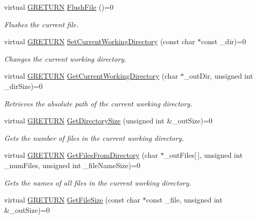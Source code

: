 \begin{DoxyCompactItemize}
virtual \hyperlink{namespace_g_w_a69b1aaebac1cac8049825f035884c95b}{G\+R\+E\+T\+U\+RN} \hyperlink{class_g_w_1_1_c_o_r_e_1_1_g_file_a185d248041bf79161654a00ddb38c314}{Flush\+File} ()=0
\begin{DoxyCompactList}\small\item\em Flushes the current file. \end{DoxyCompactList}\item 
virtual \hyperlink{namespace_g_w_a69b1aaebac1cac8049825f035884c95b}{G\+R\+E\+T\+U\+RN} \hyperlink{class_g_w_1_1_c_o_r_e_1_1_g_file_a53c4aba44ab5069f952f46ac8caee827}{Set\+Current\+Working\+Directory} (const char $\ast$const \+\_\+dir)=0
\begin{DoxyCompactList}\small\item\em Changes the current working directory. \end{DoxyCompactList}\item 
virtual \hyperlink{namespace_g_w_a69b1aaebac1cac8049825f035884c95b}{G\+R\+E\+T\+U\+RN} \hyperlink{class_g_w_1_1_c_o_r_e_1_1_g_file_a01e2d9e0f2266c694f68f527f1df330c}{Get\+Current\+Working\+Directory} (char $\ast$\+\_\+out\+Dir, unsigned int \+\_\+dir\+Size)=0
\begin{DoxyCompactList}\small\item\em Retrieves the absolute path of the current working directory. \end{DoxyCompactList}\item 
virtual \hyperlink{namespace_g_w_a69b1aaebac1cac8049825f035884c95b}{G\+R\+E\+T\+U\+RN} \hyperlink{class_g_w_1_1_c_o_r_e_1_1_g_file_a8210211fe369049a0a67f0329347fbfa}{Get\+Directory\+Size} (unsigned int \&\+\_\+out\+Size)=0
\begin{DoxyCompactList}\small\item\em Gets the number of files in the current working directory. \end{DoxyCompactList}\item 
virtual \hyperlink{namespace_g_w_a69b1aaebac1cac8049825f035884c95b}{G\+R\+E\+T\+U\+RN} \hyperlink{class_g_w_1_1_c_o_r_e_1_1_g_file_acf75a8b6b63e14d2d646e83c4974694d}{Get\+Files\+From\+Directory} (char $\ast$\+\_\+out\+Files\mbox{[}$\,$\mbox{]}, unsigned int \+\_\+num\+Files, unsigned int \+\_\+file\+Name\+Size)=0
\begin{DoxyCompactList}\small\item\em Gets the names of all files in the current working directory. \end{DoxyCompactList}\item 
virtual \hyperlink{namespace_g_w_a69b1aaebac1cac8049825f035884c95b}{G\+R\+E\+T\+U\+RN} \hyperlink{class_g_w_1_1_c_o_r_e_1_1_g_file_afefc1aa26f9e30276799d007d00f96f9}{Get\+File\+Size} (const char $\ast$const \+\_\+file, unsigned int \&\+\_\+out\+Size)=0

\end{DoxyCompactItemize}
